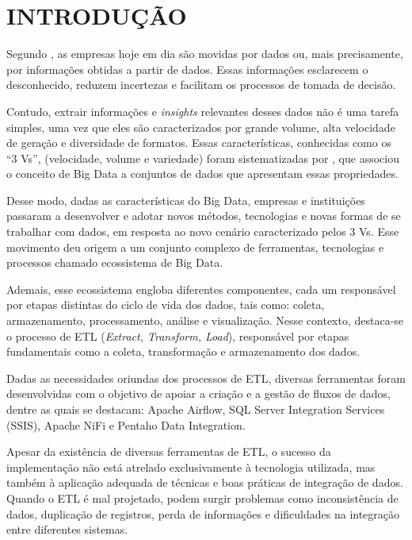 
\chapter{INTRODUÇÃO}
\thispagestyle{myheadings}

Segundo , as empresas hoje em dia são movidas por dados ou, mais precisamente, por 
informações obtidas a partir de dados. Essas informações esclarecem o desconhecido, reduzem incertezas 
e facilitam os processos de tomada de decisão.

Contudo, extrair informações e \textit{insights} relevantes desses dados não é uma tarefa simples, uma vez que eles 
são caracterizados por grande volume, alta velocidade de geração e diversidade de formatos. Essas 
características, conhecidas como os “3 Vs”, (velocidade, volume e variedade) foram sistematizadas 
por , que associou o conceito de Big Data a conjuntos de dados que apresentam essas 
propriedades.

Desse modo, dadas as características do Big Data, empresas e instituições passaram a desenvolver e adotar 
novos métodos, tecnologias e novas formas de se trabalhar com dados, em resposta ao novo cenário 
caracterizado pelos 3 Vs. Esse movimento deu origem a um conjunto complexo de ferramentas, tecnologias e 
processos chamado ecossistema de Big Data.

Ademais, esse ecossistema engloba diferentes componentes, cada um responsável por etapas distintas do ciclo
de vida dos dados, tais como: coleta, armazenamento, processamento, análise e visualização. Nesse contexto, 
destaca-se o processo de ETL (\textit{Extract, Transform, Load}), responsável por etapas fundamentais como a coleta,
transformação e armazenamento dos dados. 

Dadas as necessidades oriundas dos processos de ETL, diversas ferramentas foram desenvolvidas com o 
objetivo de apoiar a criação e a gestão de fluxos de dados, dentre as quais se destacam: Apache Airflow, 
SQL Server Integration Services (SSIS), Apache NiFi e Pentaho Data Integration.

Apesar da existência de diversas ferramentas de ETL, o sucesso da implementação não está atrelado 
exclusivamente à tecnologia utilizada, mas também à aplicação adequada de técnicas e boas práticas de 
integração de dados. Quando o ETL é mal projetado, podem surgir problemas como inconsistência de dados, 
duplicação de registros, perda de informações e dificuldades na integração entre diferentes sistemas.

